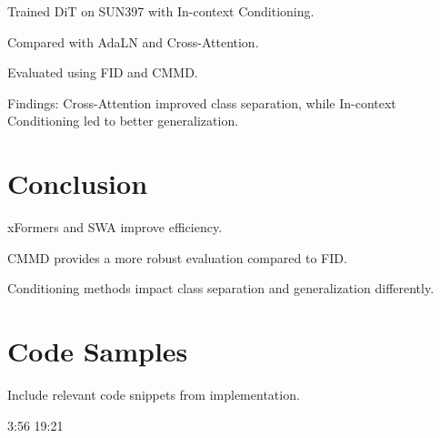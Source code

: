 \documentclass{article}
\begin{document}
Trained DiT on SUN397 with In-context Conditioning.

Compared with AdaLN and Cross-Attention.

Evaluated using FID and CMMD.

Findings: Cross-Attention improved class separation, while In-context Conditioning led to better generalization.

\section{Conclusion}

xFormers and SWA improve efficiency.

CMMD provides a more robust evaluation compared to FID.

Conditioning methods impact class separation and generalization differently.

\appendix
\section{Code Samples}
Include relevant code snippets from implementation.


3:56
19:21
\end{document}
